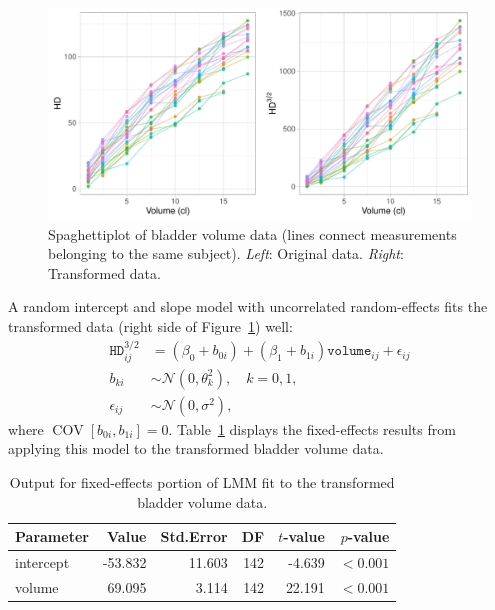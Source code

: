 \documentclass{article}\usepackage[]{graphicx}\usepackage[]{color}
\newenvironment{knitrout}{}{} %
\newcommand{\COV}{\operatorname{COV}}
\begin{document}
\begin{knitrout}
\color{fgcolor}\begin{figure}[!htb]
\includegraphics[width=\linewidth]{figure/spaghetti-1} \caption{Spaghettiplot of bladder volume data (lines connect measurements belonging to the same subject). \textit{Left}: Original data. \textit{Right}: Transformed data.}\label{fig:spaghetti}
\end{figure}


\end{knitrout}

A random intercept and slope model with uncorrelated random-effects fits the transformed data (right side of Figure~\ref{fig:spaghetti}) well:
\begin{align*}
  \texttt{HD}^{3/2}_{ij} &= \left(\beta_0 + b_{0i}\right) + \left(\beta_1 + b_{1i}\right)\texttt{volume}_{ij} + \epsilon_{ij} \\
  b_{ki} &\sim \mathcal{N}\left(0, \theta_k^2\right), \quad k = 0, 1, \\
  \epsilon_{ij} &\sim \mathcal{N}\left(0, \sigma^2\right),
\end{align*}
where $\COV\left[b_{0i}, b_{1i}\right] = 0$.  Table~\ref{tab:transformed-lmm} displays the fixed-effects results from applying this model to the transformed bladder volume data. %



\begin{table}
\begin{tabular}{lrrrrr}
  \hline
  Parameter & Value   & Std.Error & DF  & $t$-value & $p$-value\\
  \hline
  intercept & -53.832 & 11.603    & 142 & -4.639    & $<0.001$\\
  volume    & 69.095  & 3.114     & 142 & 22.191    & $<0.001$\\
  \hline
  \end{tabular}
  \caption{Output for fixed-effects portion of LMM fit to the transformed bladder volume data.} 
  \label{tab:transformed-lmm}
\end{table}
\end{document}

